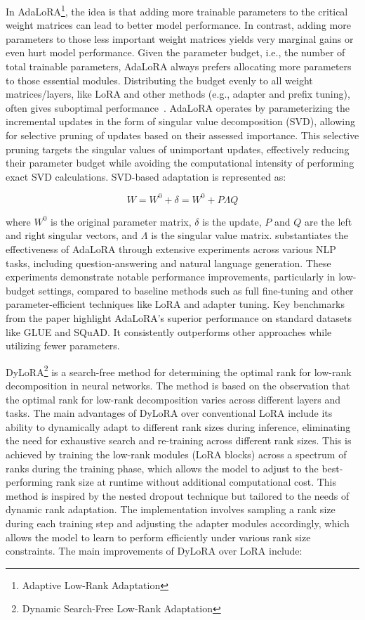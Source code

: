 In AdaLoRA\footnote{Adaptive Low-Rank Adaptation}, the idea is that adding more trainable parameters to the critical weight matrices can lead to better model performance.
In contrast, adding more parameters to those less important weight matrices yields very marginal gains or even hurt model performance.
Given the parameter budget, i.e., the number of total trainable parameters, AdaLoRA always prefers allocating more parameters to those essential modules.
Distributing the budget evenly to all weight matrices/layers, like LoRA and other methods (e.g., adapter and prefix
tuning), often gives suboptimal performance~\cite{zhang2023adalora}.
AdaLoRA operates by parameterizing the incremental updates in the form of singular value decomposition (SVD), allowing for selective pruning of updates based on their assessed importance.
This selective pruning targets the singular values of unimportant updates, effectively reducing their parameter budget while avoiding the computational intensity of performing exact SVD calculations.
SVD-based adaptation is represented as:

\begin{equation}
	W = W^{0} + \delta = W^{0} + P \Lambda Q
	\label{eq:svd-adaptation}
\end{equation}

\noindent where $W^{0}$ is the original parameter matrix, $\delta$ is the update, $P$ and $Q$ are the left and right singular vectors, and $\Lambda$ is the singular value matrix.
\textcite{zhang2023adalora} substantiates the effectiveness of AdaLoRA through extensive experiments across various NLP tasks, including question-answering and natural language generation.
These experiments demonstrate notable performance improvements, particularly in low-budget settings, compared to baseline methods such as full fine-tuning and other parameter-efficient techniques like LoRA and adapter tuning.
Key benchmarks from the paper highlight AdaLoRA's superior performance on standard datasets like GLUE and SQuAD. It consistently outperforms other approaches while utilizing fewer parameters.

DyLoRA\footnote{Dynamic Search-Free Low-Rank Adaptation} is a search-free method for determining the optimal rank for low-rank decomposition in neural networks.
The method is based on the observation that the optimal rank for low-rank decomposition varies across different layers and tasks.
The main advantages of DyLoRA over conventional LoRA include its ability to dynamically adapt to different rank sizes during inference, eliminating the need for exhaustive search and re-training across different rank sizes.
This is achieved by training the low-rank modules (LoRA blocks) across a spectrum of ranks during the training phase, which allows the model to adjust to the best-performing rank size at runtime without additional computational cost.
This method is inspired by the nested dropout technique but tailored to the needs of dynamic rank adaptation.
The implementation involves sampling a rank size during each training step and adjusting the adapter modules accordingly, which allows the model to learn to perform efficiently under various rank size constraints.
The main improvements of DyLoRA over LoRA include:

